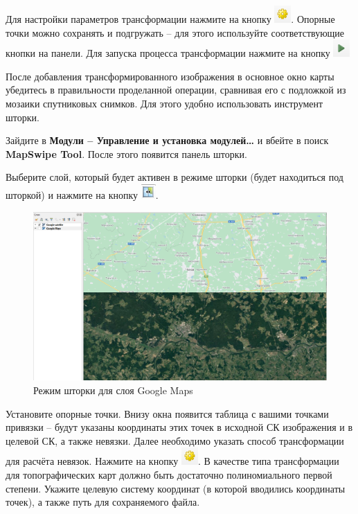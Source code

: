 \documentclass[
  12pt,
]{book}
\begin{document}
Для настройки параметров трансформации нажмите на кнопку \includegraphics{images/Ref02/Transformation_settings.png}. Опорные точки можно сохранять и подгружать -- для этого используйте соответствующие кнопки на панели. Для запуска процесса трансформации нажмите на кнопку \includegraphics{images/Ref02/Transformation_button.png}

После добавления трансформированного изображения в основное окно карты убедитесь в правильности проделанной операции, сравнивая его с подложкой из мозаики спутниковых снимков. Для этого удобно использовать инструмент шторки.

Зайдите в \textbf{Модули -- Управление и установка модулей\ldots{}} и вбейте в поиск \textbf{MapSwipe Tool}. После этого появится панель шторки.

Выберите слой, который будет активен в режиме шторки (будет находиться под шторкой) и нажмите на кнопку \includegraphics{images/Ref02/Swipe_button.png}.

\begin{figure}
\centering
\includegraphics{images/Ref02/Swipe.png}
\caption{Режим шторки для слоя Google Maps}
\end{figure}

Установите опорные точки. Внизу окна появится таблица с вашими точками привязки -- будут указаны координаты этих точек в исходной СК изображения и в целевой СК, а также невязки. Далее необходимо указать способ трансформации для расчёта невязок. Нажмите на кнопку \includegraphics{images/Ref02/Transformation_settings.png}. В качестве типа трансформации для топографических карт должно быть достаточно полиномиального первой степени. Укажите целевую систему координат (в которой вводились координаты точек), а также путь для сохраняемого файла.
\end{document}
